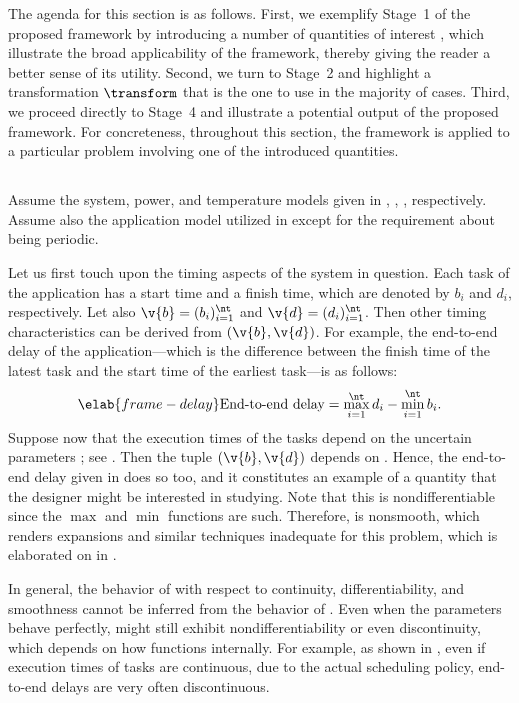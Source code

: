 The agenda for this section is as follows. First, we exemplify Stage~1 of the
proposed framework by introducing a number of quantities of interest \g, which
illustrate the broad applicability of the framework, thereby giving the reader a
better sense of its utility. Second, we turn to Stage~2 and highlight a
transformation $\transform$ that is the one to use in the majority of cases.
Third, we proceed directly to Stage~4 and illustrate a potential output of the
proposed framework. For concreteness, throughout this section, the framework is
applied to a particular problem involving one of the introduced quantities.

\subsection{\problemtitle}

Assume the system, power, and temperature models given in ,
, , respectively. Assume also the
application model utilized in  except for the
requirement about being periodic.

Let us first touch upon the timing aspects of the system in question. Each task
of the application has a start time and a finish time, which are denoted by
$b_i$ and $d_i$, respectively. Let also $\v{b} = (b_i)_{i = 1}^\nt$ and $\v{d} =
(d_i)_{i = 1}^\nt$. Then other timing characteristics can be derived from
$(\v{b}, \v{d})$. For example, the end-to-end delay of the application---which
is the difference between the finish time of the latest task and the start time
of the earliest task---is as follows:
\begin{equation} \elab{frame-delay}
  \text{End-to-end delay}
  = \max_{i = 1}^\nt d_i - \min_{i = 1}^\nt b_i.
\end{equation}
Suppose now that the execution times of the tasks depend on the uncertain
parameters \vu; see . Then the tuple $(\v{b}, \v{d})$
depends on \vu. Hence, the end-to-end delay given in  does so
too, and it constitutes an example of a quantity \g that the designer might be
interested in studying. Note that this \g is nondifferentiable since the $\max$
and $\min$ functions are such. Therefore, \g is nonsmooth, which renders 
expansions and similar techniques inadequate for this problem, which is
elaborated on in .

\begin{remark} 
In general, the behavior of \g with respect to continuity, differentiability,
and smoothness cannot be inferred from the behavior of \vu. Even when the
parameters behave perfectly, \g might still exhibit nondifferentiability or even
discontinuity, which depends on how \g functions internally. For example, as
shown in \cite{tanasa2015}, even if execution times of tasks are continuous, due
to the actual scheduling policy, end-to-end delays are very often discontinuous.
\end{remark}

